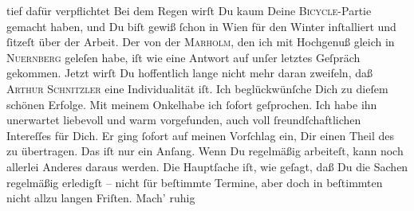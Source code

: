 \begin{ledgroupsized}[t]{13cm}
               tief dafür \strikeout{\textcolor{gray}{v}} verpflichtet{\dotsfive}\pend
           \pstart
           Bei dem Regen wirſt Du kaum Deine \textsc{Bicycle}-Partie gemacht
               haben, und Du biſt gewiß ſchon in Wien für den Winter
               inſtalliert und ſitzeſt über der Arbeit. Der \label{K_mets_Goldmann_94-partII-999v}\label{K_mets_Goldmann_94-partII-999h}{ }{\pb}von der \textsc{Marholm}, den ich mit
               Hochgenuß gleich in \textsc{Nuernberg} geleſen habe, iſt  wie eine
               Antwort auf unſer letztes Geſpräch gekommen. Jetzt wirſt Du hoffentlich lange nicht
               mehr daran zweifeln, daß \textsc{Arthur Schnitzler} eine
               Individualität iſt. Ich beglückwünſche Dich zu dieſem schönen Erfolge.\pend
           \pstart
           Mit  meinem Onkelhabe ich ſofort geſprochen. Ich habe ihn unerwartet
               liebevoll und warm vorgefunden, auch voll ſreundſchaftlichen Intereſſes für Dich. Er
               ging ſofort auf meinen Vorſchlag ein, Dir einen Theil des \label{K_L02612-2v}\label{K_L02612-2h} zu übertragen. Das iſt nur ein Anſang. Wenn Du regelmäßig arbeiteſt,
               kann noch {\pb}allerlei Anderes daraus werden. Die
               Hauptſache iſt, wie geſagt, daß Du die Sachen regelmäßig erledigſt – nicht ſür
               beſtimmte Termine, aber doch in beſtimmten nicht allzu langen Friſten. Mach’ ruhig

\end{ledgroupsized}
